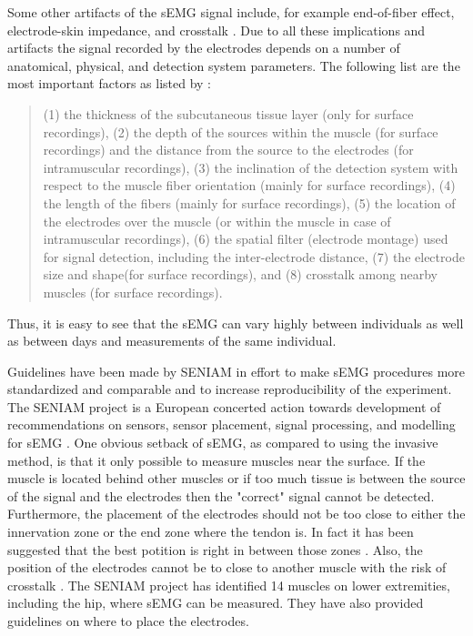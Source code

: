 Some other artifacts of the \ac{sEMG} signal include, for example end-of-fiber effect, electrode-skin impedance, and crosstalk \cite{Farina2016}.
Due to all these implications and artifacts the signal recorded by the electrodes depends on a number of anatomical, physical, and detection system parameters. The following list are the most important factors as listed by :
\begin{quote}
(1) the thickness of the subcutaneous tissue layer (only for surface recordings),
(2) the depth of the sources within the muscle (for surface recordings) and the distance from the source to the electrodes (for intramuscular recordings),
(3) the inclination of the detection system with respect to the muscle fiber orientation (mainly for surface recordings),
(4) the length of the fibers (mainly for surface recordings),
(5) the location of the electrodes over the muscle (or within the muscle in case of intramuscular recordings),
(6) the spatial filter (electrode montage) used for signal detection, including the inter-electrode distance,
(7) the electrode size and shape(for surface recordings), and
(8) crosstalk among nearby muscles (for surface recordings).
\end{quote}
Thus, it is easy to see that the \ac{sEMG} can vary highly between individuals as well as between days and measurements of the same individual.

Guidelines have been made by \ac{SENIAM} in effort to make \ac{sEMG} procedures more standardized and comparable and to increase reproducibility of the experiment. 
The \ac{SENIAM} project is a European concerted action towards development of recommendations on sensors, sensor placement, signal processing, and modelling for \ac{sEMG} \cite{Hermens1999, Hermens2000}.
One obvious setback of \ac{sEMG}, as compared to using the invasive method, is that it only possible to measure muscles near the surface.
If the muscle is located behind other muscles or if too much tissue is between the source of the signal and the electrodes then the "correct" signal cannot be detected. 
Furthermore, the placement of the electrodes should not be too close to either the innervation zone or the end zone where the tendon is.
In fact it has been suggested that the best potition is right in between those zones \cite{Farina2016, Hermens2000}.
Also, the position of the electrodes cannot be to close to another muscle with the risk of crosstalk \cite{Farina2016, Hermens2000}.
The \ac{SENIAM} project has identified 14 muscles on lower extremities, including the hip, where \ac{sEMG} can be measured.
They have also provided guidelines on where to place the electrodes.

